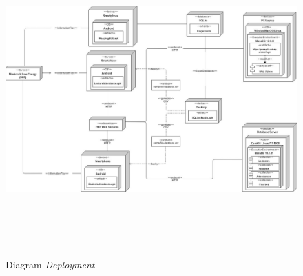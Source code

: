 					\vspace{-0.2cm}
				 \begin{landscape}
					\begin{figure}[H]
						\center
						\includegraphics [width = 22.5cm, height=12cm]{gambar/model/deployment-diagram}
						\caption{Diagram \textit{Deployment}}
					\label{deployment-diagram}
					\end{figure}
				  \end{landscape}
									
 	
